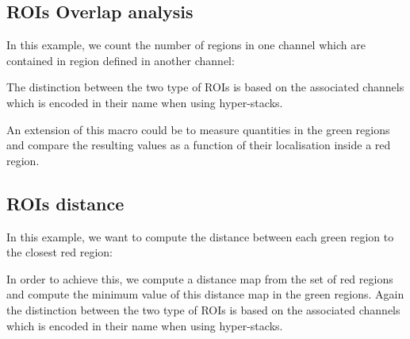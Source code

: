 { \subsection{ROIs Overlap analysis}
 In this example, we count the number of regions in one channel
 which are contained in region defined in another channel:
 \begin{figure}[h]
   \begin{center}
   \end{center}
 \end{figure}
 The distinction between the two type of ROIs is based on the
 associated channels which is encoded in their name when using
 hyper-stacks.

 An extension of this macro could be to measure quantities in the
 green regions and compare the resulting values as a function of their
 localisation inside a red region.

 
 \subsection{ROIs distance}
 In this example, we want to compute the distance between each green
 region to the closest red region:
 \begin{figure}[h]
   \begin{center}
   \end{center}
 \end{figure}
 In order to achieve this, we compute a distance map from the set of
 red regions and compute the minimum value of this distance map in the
 green regions. Again the distinction between the two type of ROIs is
 based on the associated channels which is encoded in their name when
 using hyper-stacks.

}
